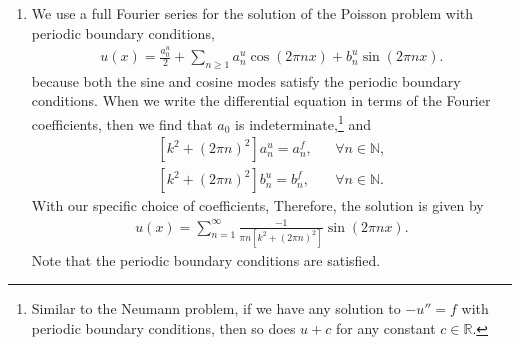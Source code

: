 \documentclass[11pt]{article}
\begin{document}
\begin{solution}
\begin{enumerate}
        \item 
        We use a full Fourier series for the solution of the Poisson problem with periodic boundary conditions,
        \begin{align*}
            u(x) = \frac{a^{u}_0}{2} + \sum_{n \geq 1} a^{u}_{n} \cos( 2 \pi n x ) + b^{u}_{n} \sin( 2 \pi n x ).
        \end{align*}
        because both the sine and cosine modes satisfy the periodic boundary conditions. 
        When we write the differential equation in terms of the Fourier coefficients, then we find that $a_0$ is indeterminate,\footnote{Similar 
        to the Neumann problem, if we have any solution to $-u'' = f$ with periodic boundary conditions, then so does $u+c$ for any constant $c \in \mathbb R$.} 
        and 
        \begin{align*}
            \left [k^2 + (2 \pi n)^2 \right] a^{u}_{n} = a^{f}_{n}, & & \forall n \in \mathbb{N}
            ,
            \\ 
            \left [k^2 + (2 \pi n)^2 \right] b^{u}_{n} = b^{f}_{n}, & & \forall n \in \mathbb{N}
            .
        \end{align*}
        With our specific choice of coefficients, 
        Therefore, the solution is given by
        \begin{align*}
            u(x) = \sum_{n=1}^{\infty} \frac{-1}{\pi n \left[k^2 + (2 \pi n)^2 \right]} \sin(2 \pi n x).
        \end{align*}
        Note that the periodic boundary conditions are satisfied.
    \end{enumerate}
\end{solution}



% 
\end{document}

